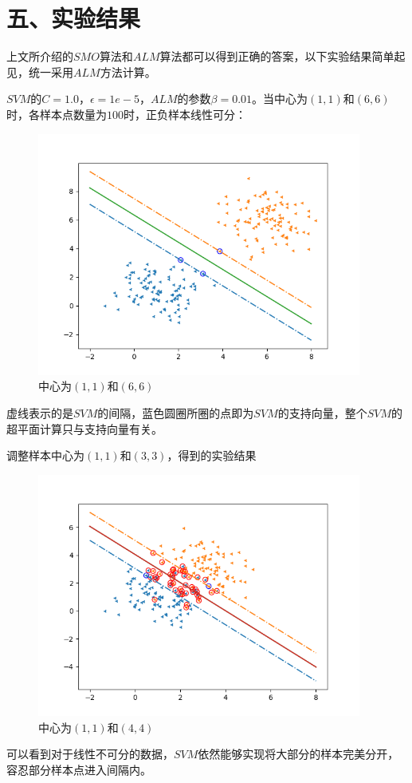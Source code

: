 \documentclass{article}
\begin{document}
\section*{\LARGE 五、实验结果}
上文所介绍的$SMO$算法和$ALM$算法都可以得到正确的答案，以下实验结果简单起见，统一采用$ALM$方法计算。

$SVM$的$C=1.0$，$\epsilon=1e-5$，$ALM$的参数$\beta=0.01$。当中心为$(1,1)$和$(6,6)$时，各样本点数量为$100$时，正负样本线性可分：
\begin{figure}[H]
    \centering
    \begin{minipage}[t]{1.0\linewidth}
        \centering
        \includegraphics[height=8cm]{Figure_1.png}
        \caption{中心为$(1,1)$和$(6,6)$}
    \end{minipage}
 \end{figure}
 虚线表示的是$SVM$的间隔，蓝色圆圈所圈的点即为$SVM$的支持向量，整个$SVM$的超平面计算只与支持向量有关。

 调整样本中心为$(1,1)$和$(3,3)$，得到的实验结果
 \begin{figure}[H]
    \centering
    \begin{minipage}[t]{1.0\linewidth}
        \centering
        \includegraphics[height=8cm]{Figure_2.png}
        \caption{中心为$(1,1)$和$(4,4)$}
    \end{minipage}
 \end{figure}
 可以看到对于线性不可分的数据，$SVM$依然能够实现将大部分的样本完美分开，容忍部分样本点进入间隔内。
\end{document}
